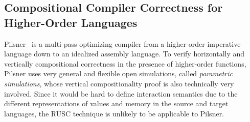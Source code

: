 


\subsection{Compositional Compiler Correctness for Higher-Order Languages}

%
Pilsner~\cite{neis:pilsner,pb} is a multi-pass optimizing compiler from
a higher-order imperative language down to an idealized assembly language.
To verify horizontally and vertically compositional correctness in the presence of higher-order functions, Pilsner uses
very general and flexible open simulations, called \emph{parametric simulations},
whose vertical compositionality proof is also technically very involved.
Since it would be hard to define interaction semantics
due to the different representations of values and
memory in the source and target languages,
the RUSC technique is unlikely to be applicable to Pilsner.

